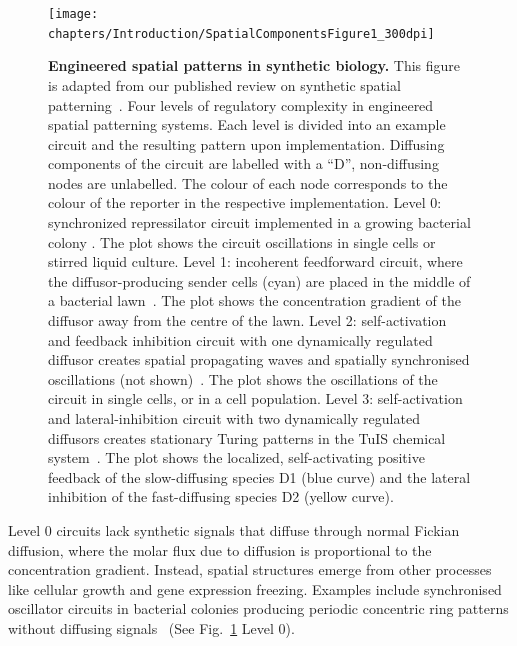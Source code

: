\begin{figure}[H]
    \centering
    \texttt{[image: chapters/Introduction/SpatialComponentsFigure1\_300dpi]}
    \caption{\textbf{Engineered spatial patterns in synthetic biology.} This figure is adapted from our published review on synthetic spatial patterning~\parencite{huidobro}. Four levels of regulatory complexity in engineered spatial patterning systems. Each level is divided into an example circuit and the resulting pattern upon implementation. Diffusing components of the circuit are labelled with a “D”, non-diffusing nodes are unlabelled. The colour of each node corresponds to the colour of the reporter in the respective implementation. Level 0: synchronized repressilator circuit implemented in a growing bacterial colony \parencite{Potvin-Trottier2016}. The plot shows the circuit oscillations in single cells or stirred liquid culture. Level 1: incoherent feedforward circuit, where the diffusor-producing sender cells (cyan) are placed in the middle of a bacterial lawn~\parencite{Basu2005}. The plot shows the concentration gradient of the diffusor away from the centre of the lawn. Level 2: self-activation and feedback inhibition circuit with one dynamically regulated diffusor creates spatial propagating waves and spatially synchronised oscillations (not shown)~\parencite{Danino2010}. The plot shows the oscillations of the circuit in single cells, or in a cell population. Level 3: self-activation and lateral-inhibition circuit with two dynamically regulated diffusors creates stationary Turing patterns in the TuIS chemical system~\parencite{Horvath}. The plot shows the localized, self-activating positive feedback of the slow-diffusing species D1 (blue curve) and the lateral inhibition of the fast-diffusing species D2 (yellow curve).} %
    \label{fig:engineered_patterns}
\end{figure}

Level 0 circuits lack synthetic signals that diffuse through normal Fickian diffusion, where the molar flux due to diffusion is proportional to the concentration gradient.
Instead, spatial structures emerge from other processes like cellular growth and gene expression freezing.
Examples include synchronised oscillator circuits in bacterial colonies producing periodic concentric ring patterns without diffusing signals~\parencite{Potvin-Trottier2016, Riglar2019} (See Fig.~\ref{fig:engineered_patterns} Level 0).


